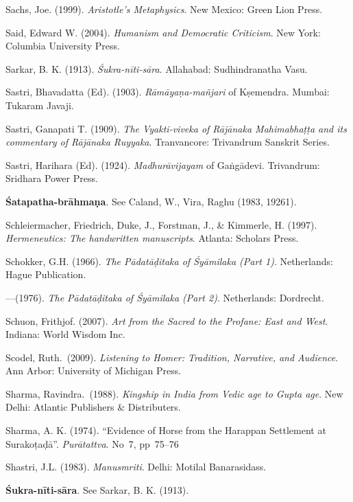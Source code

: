 \begin{thebibliography}{99}
Sachs, Joe. (1999). {\sl Aristotle’s Metaphysics}. New Mexico: Green Lion Press. 

Said, Edward W. (2004).  {\sl Humanism and Democratic Criticism}. New York: Columbia University Press. 

Sarkar, B. K. (1913). {\sl Śukra-nīti-sāra}. Allahabad: Sudhindranatha Vasu. 

Sastri, Bhavadatta (Ed). (1903). {\sl Rāmāyaṇa-mañjari} of Kṣemendra. Mumbai: Tukaram Javaji. 

Sastri, Ganapati T. (1909). {\sl The Vyakti-viveka of Rājānaka Mahimabhaṭṭa and its commentary of Rājānaka Ruyyaka}. Tranvancore: Trivandrum Sanskrit Series. 

Sastri, Harihara (Ed). (1924). {\sl Madhurāvijayam} of Gaṅgādevi. Trivandrum: Sridhara Power Press. 

{\bf Śatapatha-brāhmaṇa}. See Caland, W., Vira, Raghu (1983, 19261).

Schleiermacher, Friedrich, Duke, J., Forstman, J., \& Kimmerle, H. (1997). {\sl Hermeneutics: The handwritten manuscripts}. Atlanta: Scholars Press.  

Schokker, G.H. (1966). {\sl The Pādatāḍitaka of Śyāmilaka (Part 1)}. Netherlands: Hague Publication. 

---\kern3pt(1976). {\sl The Pādatāḍitaka of Śyāmilaka (Part 2)}. Netherlands: Dordrecht. 

Schuon, Frithjof. (2007). {\sl Art from the Sacred to the Profane: East and West}. Indiana: World Wisdom Inc. 

Scodel, Ruth.\ (2009). {\sl Listening to Homer: Tradition, Narrative, and Audience}. Ann Arbor: University of Michigan Press. 

Sharma, Ravindra.\ (1988). {\sl Kingship in India from Vedic age to Gupta age}. New Delhi: Atlantic Publishers \& Distributers. 

Sharma, A. K. (1974). “Evidence of Horse from the Harappan Settlement at Surakoṭaḍā”. {\sl Purātattva}. No~7, pp~75--76

Shastri, J.L. (1983). {\sl Manusmriti}. Delhi: Motilal Banarasidass. 

{\bf Śukra-nīti-sāra}. See Sarkar, B. K. (1913). 


\end{thebibliography}
